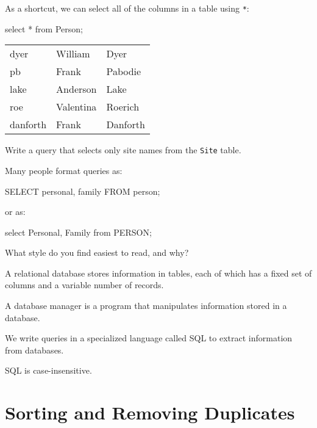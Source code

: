 \documentclass{book}
\begin{document}
As a shortcut, we can select all of the columns in a table using
\texttt{*}:

\begin{VerbIn}
select * from Person;
\end{VerbIn}

\begin{tabular}{lll}
dyer & William & Dyer \\
pb & Frank & Pabodie \\
lake & Anderson & Lake \\
roe & Valentina & Roerich \\
danforth & Frank & Danforth \\
\end{tabular}

\begin{challenge}
  Write a query that selects only site names from the \texttt{Site}
  table.
\end{challenge}

\begin{challenge}
  Many people format queries as:

\begin{VerbIn}
SELECT personal, family FROM person;
\end{VerbIn}

  or as:

\begin{VerbIn}
select Personal, Family from PERSON;
\end{VerbIn}

  What style do you find easiest to read, and why?
\end{challenge}

\begin{keypoints}
\begin{swcitemize}
\item
  A relational database stores information in tables, each of which has
  a fixed set of columns and a variable number of records.
\item
  A database manager is a program that manipulates information stored in
  a database.
\item
  We write queries in a specialized language called SQL to extract
  information from databases.
\item
  SQL is case-insensitive.
\end{swcitemize}
\end{keypoints}

\section{Sorting and Removing Duplicates}
\end{document}
